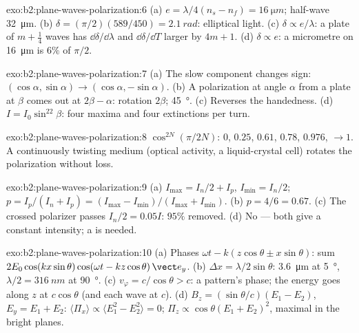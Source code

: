 \begin{solution}{exo:b2:plane-waves-polarization:6}
(a) $e = \lambda/4(n_s - n_f) = \qty{16}{\micro m}$; half-wave \qty{32}{\micro m}. (b) $\delta =
(\pi/2)(589/450) = \qty{2.1}{rad}$: elliptical light. (c) $\delta \propto e/\lambda$: a
plate of $m + \tfrac14$ waves has $\dd\delta/\dd\lambda$ and $\dd\delta/\dd T$ larger by
$4m + 1$. (d) $\delta \propto e$: a micrometre on \qty{16}{\micro m} is $6\%$ of $\pi/2$.
\end{solution}

\begin{solution}{exo:b2:plane-waves-polarization:7}
(a) The slow component changes sign: $(\cos\alpha, \sin\alpha) \to (\cos\alpha,
-\sin\alpha)$. (b) A polarization at angle $\alpha$ from a plate at $\beta$ comes
out at $2\beta - \alpha$: rotation $2\beta$; \qty{45}{\degree}. (c) Reverses the
handedness. (d) $I = I_0\sin^22\beta$: four maxima and four extinctions
per turn.
\end{solution}

\begin{solution}{exo:b2:plane-waves-polarization:8}
$\cos^{2N}(\pi/2N)$: $0$, $0.25$, $0.61$, $0.78$, $0.976$, $\to 1$. A
continuously twisting medium (optical activity, a liquid-crystal cell)
rotates the polarization without loss.
\end{solution}

\begin{solution}{exo:b2:plane-waves-polarization:9}
(a) $I_{\max} = I_n/2 + I_p$, $I_{\min} = I_n/2$; $p = I_p/(I_n + I_p) = (I_{\max} -
I_{\min})/(I_{\max} + I_{\min})$. (b) $p = 4/6 = 0.67$. (c) The crossed polarizer
passes $I_n/2 = 0.05I$: $95\%$ removed. (d) No --- both give a constant
intensity; a  is needed.
\end{solution}

\begin{solution}{exo:b2:plane-waves-polarization:10}
(a) Phases $\omega t - k(z\cos\theta \pm x\sin\theta)$: sum $2E_0\cos(kx\sin\theta)\cos(\omega t
- kz\cos\theta)\,\vect e_y$. (b) $\Delta x = \lambda/2\sin\theta$: \qty{3.6}{\micro m} at \qty{5}{\degree},
$\lambda/2 = \qty{316}{nm}$ at \qty{90}{\degree}. (c) $v_\varphi = c/\cos\theta > c$: a pattern's
phase; the energy goes along $z$ at $c\cos\theta$ (and each wave at $c$).
(d) $B_z = (\sin\theta/c)(E_1 - E_2)$, $E_y = E_1 + E_2$: $\langle\Pi_x\rangle \propto
\langle E_1^2 - E_2^2\rangle = 0$; $\Pi_z \propto \cos\theta(E_1 + E_2)^2$, maximal in the
bright planes.
\end{solution}

